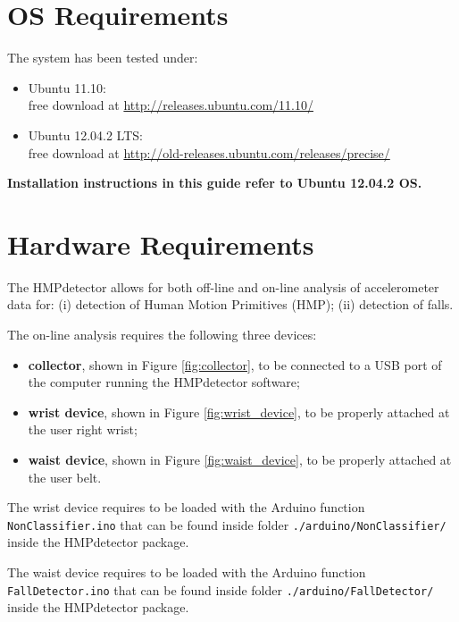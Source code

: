 \documentclass[10pt,a4paper]{report}
\begin{document}
\section{OS Requirements}

The system has been tested under:
\begin{itemize}
\item Ubuntu 11.10:\\
free download at \url{http://releases.ubuntu.com/11.10/} 
\item Ubuntu 12.04.2 LTS:\\
free download at \url{http://old-releases.ubuntu.com/releases/precise/}
\end{itemize}
\textbf{Installation instructions in this guide refer to Ubuntu 12.04.2 OS.}

\section{Hardware Requirements}

The HMPdetector allows for both off-line and on-line analysis of accelerometer data for: (i) detection of Human Motion Primitives (HMP); (ii) detection of falls.

The on-line analysis requires the following three devices:
\begin{itemize}
\item \textbf{collector}, shown in Figure \ref{fig:collector}, to be connected to a USB port of the computer running the HMPdetector software;
\item \textbf{wrist device}, shown in Figure \ref{fig:wrist_device}, to be properly attached at the user right wrist;
\item \textbf{waist device}, shown in Figure \ref{fig:waist_device}, to be properly attached at the user belt.
\end{itemize}

The wrist device requires to be loaded with the Arduino function \verb+NonClassifier.ino+ that can be found inside folder \verb+./arduino/NonClassifier/+ inside the HMPdetector package.

The waist device requires to be loaded with the Arduino function \verb+FallDetector.ino+ that can be found inside folder \verb+./arduino/FallDetector/+ inside the HMPdetector package.
\end{document}
